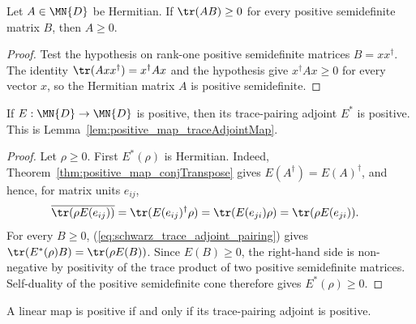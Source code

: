 \begin{theorem}
    \label{thm:psd_trace_pairing_self_dual}
    \leanok
    Let $A \in \MN{D}$ be Hermitian. If $\tr(AB)\geq 0$ for every
    positive semidefinite matrix $B$, then $A\geq 0$.
\end{theorem}

\begin{proof}
    \leanok
    Test the hypothesis on rank-one positive semidefinite matrices
    $B=xx^\dagger$. The identity $\tr(Axx^\dagger)=x^\dagger A x$ and the
    hypothesis give $x^\dagger A x\geq 0$ for every vector $x$, so the
    Hermitian matrix $A$ is positive semidefinite.
\end{proof}

\begin{theorem}\label{thm:trace_pairing_adjoint_positive}
    \leanok
    If $E : \MN{D}\to\MN{D}$ is positive, then its trace-pairing adjoint $E^*$
    is positive. This is Lemma~\ref{lem:positive_map_traceAdjointMap}.
\end{theorem}

\begin{proof}
    \leanok
    Let $\rho\geq 0$. First $E^*(\rho)$ is Hermitian. Indeed,
    Theorem~\ref{thm:positive_map_conjTranspose} gives
    $E(A^\dagger)=E(A)^\dagger$, and hence, for matrix units
    $e_{ij}$,
    \begin{align}
        \overline{\tr(\rho E(e_{ij}))}
         & =\tr(E(e_{ij})^\dagger\rho)
        =\tr(E(e_{ji})\rho)
        =\tr(\rho E(e_{ji})).
        \notag
    \end{align}
    For every $B\geq 0$, (\ref{eq:schwarz_trace_adjoint_pairing}) gives
    $\tr(E^*(\rho)B)=\tr(\rho E(B))$.
    Since $E(B)\geq 0$, the right-hand side is non-negative by positivity of
    the trace product of two positive semidefinite matrices. Self-duality of
    the positive semidefinite cone therefore gives $E^*(\rho)\geq 0$.
\end{proof}

\begin{theorem}\label{thm:trace_pairing_adjoint_positive_iff}
    \leanok
    A linear map is positive if and only if its trace-pairing adjoint is
    positive.
\end{theorem}


